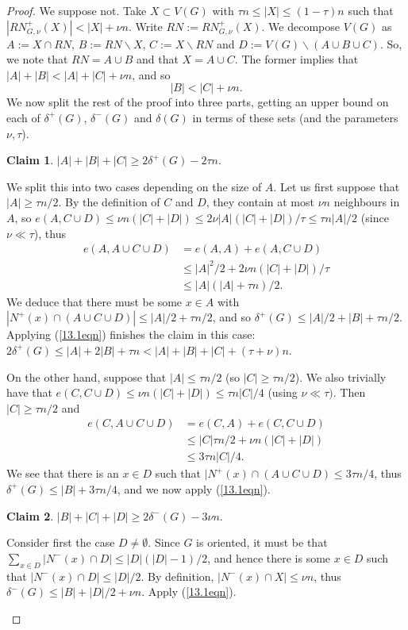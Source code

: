 \documentclass[10pt,letterpaper, reqno]{amsart}
\theoremstyle{definition}
\numberwithin{equation}{section}
\newtheorem{claim}{Claim}
\begin{document}
\begin{proof}
	We suppose not. Take $X \subset V(G)$ with $\tau n \leq |X| \leq (1-\tau)n$ such that $|RN^+_{G,\nu}(X)| < |X| + \nu n$. Write $RN := RN^+_{G,\nu}(X)$. We decompose $V(G)$ as $A := X \cap RN$, $B := RN \backslash X$, $C := X\backslash RN$ and $D := V(G) \backslash (A \cup B \cup C)$. So, we note that $RN = A \cup B$ and that $X = A \cup C$. The former implies that $|A|+|B| < |A| + |C| + \nu n$, and so 
	\begin{equation}\label{13.1eqn}
		|B| < |C| + \nu n.
	\end{equation}
	We now split the rest of the proof into three parts, getting an upper bound on each of $\delta^+(G)$, $\delta^-(G)$ and $\delta(G)$ in terms of these sets (and the parameters $\nu,\tau$).
	\begin{claim}
		$|A| + |B| + |C| \geq 2\delta^+(G) - 2\tau n$.
	\end{claim}
	\begin{adjustwidth}{2.5em}{0pt}
		We split this into two cases depending on the size of $A$. Let us first suppose that $|A| \geq \tau n/2$. By the definition of $C$ and $D$, they contain at most $\nu n$ neighbours in $A$, so  $e(A, C \cup D) \leq \nu n (|C|+|D|) \leq 2\nu |A|(|C|+|D|)/\tau \leq \tau n |A|/2$ (since $\nu \ll \tau$), thus
		\begin{align*}
			e(A, A \cup C \cup D) &= e(A,A) + e(A, C \cup D) \\
			& \leq |A|^2/2 + 2\nu n (|C| + |D|)/\tau \\
			& \leq |A|(|A| + \tau n)/2.
		\end{align*}
		We deduce that there must be some $x \in A$ with $|N^+(x) \cap (A \cup C \cup D)| \leq |A|/2 + \tau n/2$, and so $\delta^+(G) \leq |A|/2 + |B| + \tau n/2$. Applying (\ref{13.1eqn}) finishes the claim in this case: $2\delta^+(G) \leq |A|+2|B| + \tau n < |A|+|B|+|C| + (\tau + \nu) n$.
		
		On the other hand, suppose that $|A| \leq \tau n/2$ (so $|C| \geq \tau n/2$). We also trivially have that $e(C, C \cup D)\leq \nu n(|C| + |D|) \leq \tau n |C|/4$ (using $\nu \ll \tau)$. Then $|C| \geq \tau n/2$ and
		\begin{align*}
			e(C, A \cup C \cup D) & = e(C,A) + e(C, C \cup D) \\
			&\leq |C|\tau n/2 + \nu n (|C| + |D|) \\
			&\leq 3\tau n |C|/4.
		\end{align*}
		We see that there is an $x \in D$ such that $|N^+(x) \cap (A \cup C \cup D) \leq 3\tau n/4$, thus $\delta^+(G) \leq |B| + 3\tau n/4$, and we now apply (\ref{13.1eqn}). 
	\end{adjustwidth}
	\begin{claim}
		$|B| + |C| + |D| \geq 2\delta^-(G) - 3 \nu n$.
	\end{claim}
	\begin{adjustwidth}{2.5em}{0pt}
		Consider first the case $D \neq \emptyset$. Since $G$ is oriented, it must be that $\sum_{x \in D} |N^-(x) \cap D| \leq |D|(|D|-1)/2$, and hence there is some $x \in D$ such that $|N^-(x) \cap D| \leq |D|/2$. By definition, $|N^-(x) \cap X| \leq \nu n$, thus $\delta^-(G) \leq |B| + |D|/2 + \nu n$. Apply (\ref{13.1eqn}). 
		

\end{adjustwidth}
\end{proof}
\end{document}
